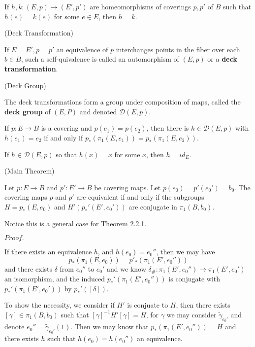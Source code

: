 \documentclass{article}
\newcommand{\Pf}[1]{$Proof.$\par}
\begin{document}
\begin{proposition}
    If $h,k:(E,p) \to (E',p')$ are homeomorphisms of coverings $p,p'$ of $B$ such that $h(e) = k(e)$ for some $e\in E$, then $h=k$.
\end{proposition}

\begin{definition}(Deck Transformation)\par
    If $E=E', p=p'$ an equivalence of $p$ interchanges points in the fiber over each $b\in B$, such a self-quivalence is called an automorphism of $(E,p)$ or a \textbf{deck transformation}.
\end{definition}

\begin{definition}(Deck Group)\par
    The deck transformations form a group under composition of maps, called the \textbf{deck group} of $(E,P)$ and denoted $\mathcal{D}(E,p)$.
\end{definition}

\begin{corollary}
    If $p:E\to B$ is a covering and $p(e_1) = p(e_2)$, then there is $h\in \mathcal{D}(E,p)$ with $h(e_1) = e_2$ if and only if $p_*(\pi_1(E,e_1)) = p_*(\pi_1(E,e_2))$.
\end{corollary}

\begin{corollary}
    If $h\in\mathcal{D}(E,p)$ so that $h(x) = x$ for some $x$, then $h = id_E$.
\end{corollary}

\begin{theorem}(Main Theorem)\par
    Let $p:E\to B$ and $p':E'\to B$ be covering maps. Let $p(e_0) = p'(e_0') = b_0$. The covering maps $p$ and $p'$ are equivalent if and only if the subgroups $H=p_*(E,e_0)$ and $H'(p_*'(E',e_0'))$ are conjugate in $\pi_1(B,b_0)$.
\end{theorem}
    Notice this is a general case for Theorem 2.2.1.\par
\Pf\par
    If there exists an equivalence $h$, and $h(e_0) = e_0''$, then we may have \[p_*(\pi_1(E,e_0)) = p'_*(\pi_1(E',e_0''))\] and there exists $\delta$ from $e_0''$ to $e_0'$ and we know $\delta_{\#}:\pi_1(E',e_0'') \to \pi_1(E',e_0')$ an isomorphism, and the induced $p_*'(\pi_1(E',e_0''))$ is conjugate with $p_*'(\pi_1(E',e_0'))$ by $p_*'([\delta])$.\par
    To show the necessity, we consider if $H'$ is conjuate to $H$, then there exists $[\gamma] \in \pi_1(B,b_0)$ such that $[\gamma]^{-1} H' [\gamma] = H$, for $\gamma$ we may consider $\widetilde{\gamma}_{e_0'}$ and denote $e_0'' = \widetilde{\gamma}_{e_0'}(1)$. Then we may know that $p_*(\pi_1(E',e_0'')) = H$ and there exists $h$ such that $h(e_0) = h(e_0'')$ an equivalence.
\end{document}
